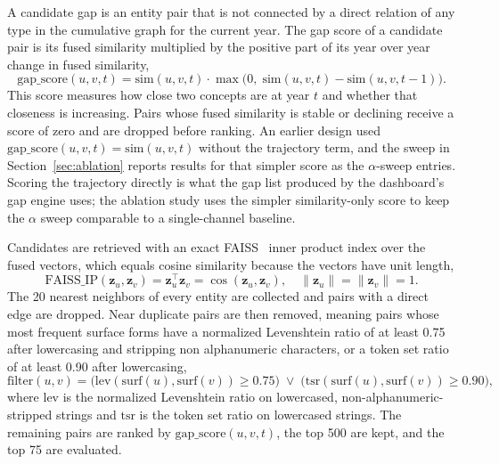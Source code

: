 \documentclass{ieeeaccess}
\begin{document}
A candidate gap is an entity pair that is not connected by a direct relation of any type in the cumulative graph for the current year. The gap score of a candidate pair is its fused similarity multiplied by the positive part of its year over year change in fused similarity,
\begin{equation}
\text{gap\_score}(u, v, t) = \text{sim}(u, v, t) \cdot \max\!\big(0,\; \text{sim}(u, v, t) - \text{sim}(u, v, t-1)\big).
\label{eq:gapscore}
\end{equation}
This score measures how close two concepts are at year $t$ and whether that closeness is increasing. Pairs whose fused similarity is stable or declining receive a score of zero and are dropped before ranking. An earlier design used $\text{gap\_score}(u, v, t) = \text{sim}(u, v, t)$ without the trajectory term, and the sweep in Section~\ref{sec:ablation} reports results for that simpler score as the $\alpha$-sweep entries. Scoring the trajectory directly is what the gap list produced by the dashboard's gap engine uses; the ablation study uses the simpler similarity-only score to keep the $\alpha$ sweep comparable to a single-channel baseline.

Candidates are retrieved with an exact FAISS~\cite{johnson2019billion, douze2024faiss} inner product index over the fused vectors, which equals cosine similarity because the vectors have unit length,
\begin{equation}
\text{FAISS\_IP}(\mathbf{z}_u, \mathbf{z}_v) = \mathbf{z}_u^{\top}\mathbf{z}_v = \cos(\mathbf{z}_u, \mathbf{z}_v), \quad \|\mathbf{z}_u\| = \|\mathbf{z}_v\| = 1.
\label{eq:faiss}
\end{equation}
The 20 nearest neighbors of every entity are collected and pairs with a direct edge are dropped. Near duplicate pairs are then removed, meaning pairs whose most frequent surface forms have a normalized Levenshtein ratio of at least 0.75 after lowercasing and stripping non alphanumeric characters, or a token set ratio of at least 0.90 after lowercasing,
\begin{equation}
\text{filter}(u, v) = \big(\text{lev}(\text{surf}(u), \text{surf}(v)) \geq 0.75\big) \;\lor\; \big(\text{tsr}(\text{surf}(u), \text{surf}(v)) \geq 0.90\big),
\label{eq:neardup}
\end{equation}
where $\text{lev}$ is the normalized Levenshtein ratio on lowercased, non-alphanumeric-stripped strings and $\text{tsr}$ is the token set ratio on lowercased strings. The remaining pairs are ranked by $\text{gap\_score}(u, v, t)$, the top 500 are kept, and the top 75 are evaluated.
\end{document}
